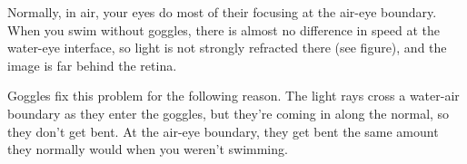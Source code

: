 Normally, in air, your eyes do most of their focusing at
the air-eye boundary. When you swim without goggles,
there is almost no difference in speed at the
water-eye interface, so light is not strongly refracted there
(see figure), and the image is far behind the retina.

Goggles fix this problem for the following reason.
The light rays cross a water-air boundary as they enter
the goggles, but they're coming in along the normal, so
they don't get bent. At the air-eye boundary, they get
bent the same amount they normally would when you
weren't swimming.
